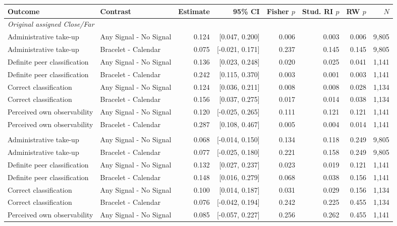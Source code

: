 \begin{tabular}{llrrrrrr}
\toprule
Outcome & Contrast & Estimate & 95\% CI & Fisher $p$ & Stud. RI $p$ & RW $p$ & $N$ \\
\midrule
\multicolumn{8}{l}{\textit{Original assigned Close/Far}} \\
Administrative take-up & Any Signal - No Signal & 0.124 & [0.047, 0.200] & 0.006 & 0.003 & 0.006 & 9,805 \\
Administrative take-up & Bracelet - Calendar & 0.075 & [-0.021, 0.171] & 0.237 & 0.145 & 0.145 & 9,805 \\
Definite peer classification & Any Signal - No Signal & 0.136 & [0.023, 0.248] & 0.020 & 0.025 & 0.041 & 1,141 \\
Definite peer classification & Bracelet - Calendar & 0.242 & [0.115, 0.370] & 0.003 & 0.001 & 0.003 & 1,141 \\
Correct classification & Any Signal - No Signal & 0.124 & [0.036, 0.211] & 0.008 & 0.008 & 0.028 & 1,134 \\
Correct classification & Bracelet - Calendar & 0.156 & [0.037, 0.275] & 0.017 & 0.014 & 0.038 & 1,134 \\
Perceived own observability & Any Signal - No Signal & 0.120 & [-0.025, 0.265] & 0.111 & 0.121 & 0.121 & 1,141 \\
Perceived own observability & Bracelet - Calendar & 0.287 & [0.108, 0.467] & 0.005 & 0.004 & 0.014 & 1,141 \\
\addlinespace
\multicolumn{8}{l}{\textit{Final realized Close/Far}} \\
Administrative take-up & Any Signal - No Signal & 0.068 & [-0.014, 0.150] & 0.134 & 0.118 & 0.249 & 9,805 \\
Administrative take-up & Bracelet - Calendar & 0.077 & [-0.025, 0.180] & 0.221 & 0.158 & 0.249 & 9,805 \\
Definite peer classification & Any Signal - No Signal & 0.132 & [0.027, 0.237] & 0.023 & 0.019 & 0.121 & 1,141 \\
Definite peer classification & Bracelet - Calendar & 0.148 & [0.016, 0.279] & 0.068 & 0.038 & 0.156 & 1,141 \\
Correct classification & Any Signal - No Signal & 0.100 & [0.014, 0.187] & 0.031 & 0.029 & 0.156 & 1,134 \\
Correct classification & Bracelet - Calendar & 0.076 & [-0.042, 0.194] & 0.242 & 0.225 & 0.455 & 1,134 \\
Perceived own observability & Any Signal - No Signal & 0.085 & [-0.057, 0.227] & 0.256 & 0.262 & 0.455 & 1,141 \\

\end{tabular}
